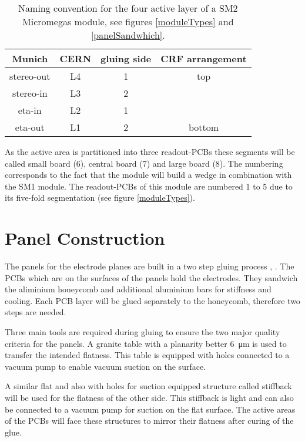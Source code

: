 \documentclass[
twoside,            %
BCOR1.4cm,          %
10pt,               %
headings=normal,    %
headsepline,        %
clearplainpage,		%
final,              %
div=14,
open=right,
bibliography=toc
]{scrreprt}
\begin{document}
\begin{table}[!h]
	\centering	
	\begin{tabular}{cccc}
		\hline
		\hline
		Munich     & CERN & gluing side & CRF arrangement
		\\
		\hline
		stereo-out & L4   & 1           & top
		\\
		stereo-in  & L3   & 2           &
		\\
		eta-in     & L2   & 1           & 
		\\
		eta-out    & L1   & 2           & bottom
		\\
		\hline
		\hline
	\end{tabular}
	\caption{
		Naming convention for the four active layer of a SM2 Micromegas module, see figures \ref{moduleTypes} and \ref{panelSandwhich}.
	}
	\label{layerNames} 
\end{table}

As the active area is partitioned into three readout-PCBs these segments will be called small board (6), central board (7) and large board (8).
The numbering corresponds to the fact that the module will build a wedge in combination with the SM1 module.
The readout-PCBs of this module are numbered 1 to 5 due to its five-fold segmentation (see figure \ref{moduleTypes}).

\section{Panel Construction}\label{panelConstruction}

The panels for the electrode planes are built in a two step gluing process
\cite{constructionLargeMicromegas} , \cite{muellerThesis}.
The PCBs which are on the surfaces of the panels hold the electrodes. 
They sandwich the aliminium honeycomb and additional aluminium bars for stiffness and cooling.
Each PCB layer will be glued separately to the honeycomb, therefore two steps are needed.

Three main tools are required during gluing to ensure the two major quality criteria for the panels.
A granite table with a planarity better \SI{6}{\micro m} is used to transfer the intended flatness.
This table is equipped with holes connected to a vacuum pump to enable vacuum suction on the surface.

A similar flat and also with holes for suction equipped structure called stiffback will be used for the flatness of the other side.
This stiffback is light and can also be connected to a vacuum pump for suction on the flat surface.
The active areas of the PCBs will face these structures to mirror their flatness after curing of the glue.
\end{document}

